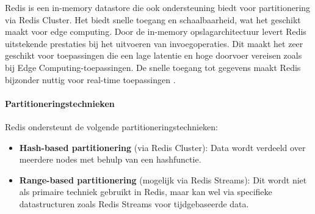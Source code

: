 Redis is een in-memory datastore die ook ondersteuning biedt voor partitionering via Redis Cluster. Het biedt snelle toegang en schaalbaarheid, wat het geschikt maakt voor edge computing. Door de in-memory opslagarchitectuur levert Redis uitstekende prestaties bij het uitvoeren van invoegoperaties. Dit maakt het zeer geschikt voor toepassingen die een lage latentie en hoge doorvoer vereisen zoals bij Edge Computing-toepassingen. De snelle toegang tot gegevens maakt Redis bijzonder nuttig voor real-time toepassingen \autocite{RedisDocumentation}.

\paragraph{Partitioneringstechnieken}  
Redis ondersteunt de volgende partitioneringstechnieken:
\begin{itemize}
    \item \textbf{Hash-based partitionering} (via Redis Cluster): Data wordt verdeeld over meerdere nodes met behulp van een hashfunctie.
    \item \textbf{Range-based partitionering} (mogelijk via Redis Streams): Dit wordt niet als primaire techniek gebruikt in Redis, maar kan wel via specifieke datastructuren zoals Redis Streams voor tijdgebaseerde data.
\end{itemize}

\begin{table}[h]
    \centering
    \caption{Overzicht van de specificaties van Redis. \cite{RedisDocumentation}}
\end{table}

